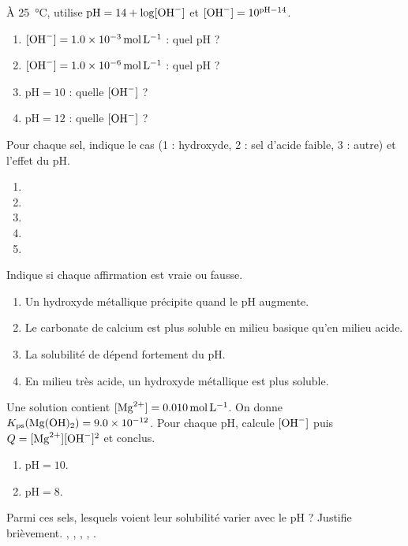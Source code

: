 \documentclass[11pt,a4paper]{article}
\begin{document}
\begin{exo}
À \qty{25}{\degreeCelsius}, utilise $\mathrm{pH}=14+\log[\ce{OH-}]$ et $[\ce{OH-}]=10^{\mathrm{pH}-14}$.
\begin{enumerate}[label=\alph*)]
  \item $[\ce{OH-}]=\qty{1.0e-3}{\mole\per\litre}$ : quel pH ?
  \item $[\ce{OH-}]=\qty{1.0e-6}{\mole\per\litre}$ : quel pH ?
  \item $\mathrm{pH}=10$ : quelle $[\ce{OH-}]$ ?
  \item $\mathrm{pH}=12$ : quelle $[\ce{OH-}]$ ?
\end{enumerate}
\end{exo}

\begin{exo}
Pour chaque sel, indique le cas (1 : hydroxyde, 2 : sel d'acide faible, 3 : autre) et l'effet du pH.
\begin{enumerate}[label=\alph*)]
  \item {}
  \item {}
  \item {}
  \item {}
  \item {}
\end{enumerate}
\end{exo}

\begin{exo}
Indique si chaque affirmation est vraie ou fausse.
\begin{enumerate}[label=\alph*)]
  \item Un hydroxyde métallique précipite quand le pH augmente.
  \item Le carbonate de calcium est plus soluble en milieu basique qu'en milieu acide.
  \item La solubilité de  dépend fortement du pH.
  \item En milieu très acide, un hydroxyde métallique est plus soluble.
\end{enumerate}
\end{exo}

\begin{exo}
Une solution contient $[\ce{Mg^{2+}}]=\qty{0.010}{\mole\per\litre}$. On donne
$K_{\mathrm{ps}}(\ce{Mg(OH)2})=\num{9.0e-12}$. Pour chaque pH, calcule $[\ce{OH-}]$ puis
$Q=[\ce{Mg^{2+}}][\ce{OH-}]^{2}$ et conclus.
\begin{enumerate}[label=\alph*)]
  \item $\mathrm{pH}=10$.
  \item $\mathrm{pH}=8$.
\end{enumerate}
\end{exo}

\begin{exo}
Parmi ces sels, lesquels voient leur solubilité varier avec le pH ? Justifie brièvement.
, \quad {}, \quad {}, \quad {}, \quad {}.
\end{exo}
\end{document}
